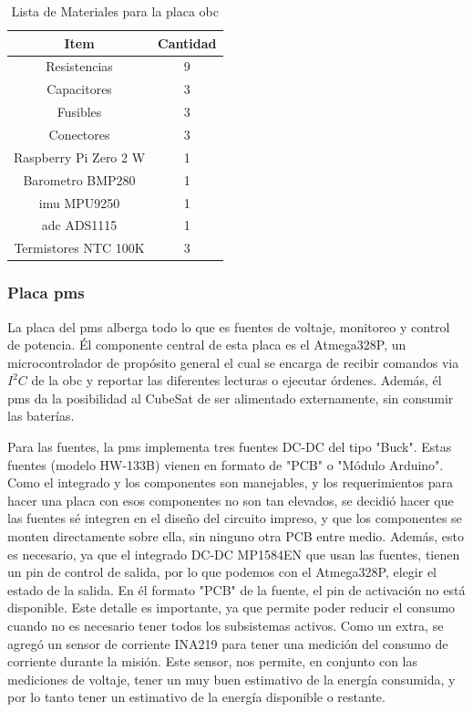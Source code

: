       \begin{table}[!ht]
        \centering
        \begin{tabular}{|c|c|}
          \hline
          \textbf{Item}           & \textbf{Cantidad} \\ \hline
          Resistencias            & 9 \\ \hline
          Capacitores             & 3 \\ \hline
          Fusibles                & 3 \\ \hline
          Conectores              & 3 \\ \hline
          Raspberry Pi Zero 2 W   & 1 \\ \hline
          Barometro BMP280        & 1 \\ \hline
          \acrshort{imu} MPU9250  & 1 \\ \hline
          \acrshort{adc} ADS1115  & 1 \\ \hline
          Termistores NTC 100K    & 3 \\ \hline
        \end{tabular}
        \caption{Lista de Materiales para la placa \acrshort{obc}}
        \label{tab:electronica.bom.obc}
      \end{table}

    \subsubsection{Placa \acrshort{pms}}
      La placa del \acrshort{pms} alberga todo lo que es fuentes de voltaje, monitoreo y control de potencia. Él
      componente central de esta placa es el Atmega328P, un microcontrolador de propósito general el cual se encarga de
      recibir comandos via $I^2C$ de la \acrshort{obc} y reportar las diferentes lecturas o ejecutar órdenes. Además, él
      \acrshort{pms} da la posibilidad al CubeSat de ser alimentado externamente, sin consumir las baterías.

      Para las fuentes, la \acrshort{pms} implementa tres fuentes DC-DC del tipo "Buck". Estas fuentes (modelo HW-133B)
      vienen en formato de "PCB" o "Módulo Arduino". Como el integrado y los componentes son manejables, y los
      requerimientos para hacer una placa con esos componentes no son tan elevados, se decidió hacer que las fuentes sé
      integren en el diseño del circuito impreso, y que los componentes se monten directamente sobre ella, sin ninguno
      otra PCB entre medio. Además, esto es necesario, ya que el integrado DC-DC MP1584EN que usan las fuentes, tienen
      un pin de control de salida, por lo que podemos con el Atmega328P, elegir el estado de la salida. En él
      formato "PCB" de la fuente, el pin de activación no está disponible. Este detalle es importante, ya que permite
      poder reducir el consumo cuando no es necesario tener todos los subsistemas activos. Como un extra, se agregó un
      sensor de corriente INA219 para tener una medición del consumo de corriente durante la misión. Este sensor, nos
      permite, en conjunto con las mediciones de voltaje, tener un muy buen estimativo de la energía consumida, y por
      lo tanto tener un estimativo de la energía disponible o restante.

